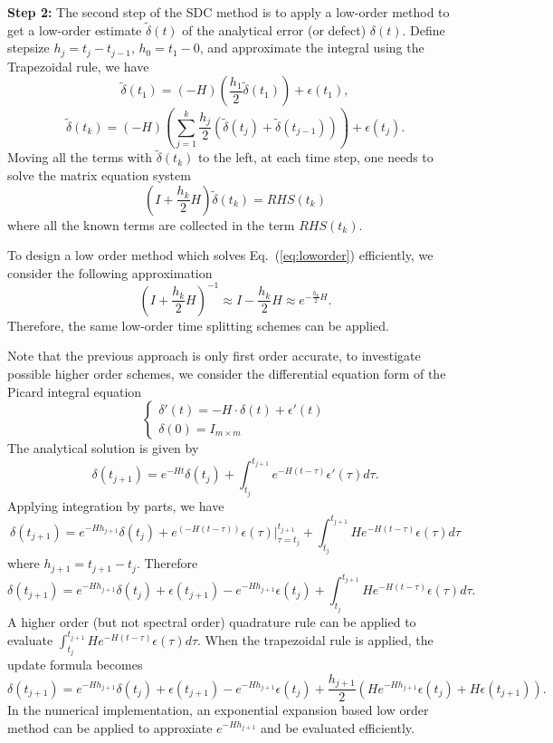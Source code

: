 \documentclass[12pt]{article}
\begin{document}
{\noindent \bf Step 2:} The second step of the SDC method is to apply a low-order method to get a low-order 
estimate $\tilde{\delta}(t)$ of the analytical error (or defect) $\delta(t)$.
Define stepsize $h_j=t_j-t_{j-1}$, $h_0=t_1-0$, and approximate the integral using the Trapezoidal rule, we have
$$\tilde{\delta}(t_1)=(-H) (\frac{h_1}{2} \tilde{\delta}(t_1) )+\epsilon(t_1),$$
$$\tilde{\delta}(t_k)=(-H) \left( \sum_{j=1}^k \frac{h_j}{2} (\tilde{\delta}(t_j)+\tilde{\delta}(t_{j-1})) 
    \right)+\epsilon(t_j).$$
Moving all the terms with $\tilde{\delta}(t_k)$ to the left, at each 
time step, one needs to solve the matrix equation system
\begin{equation}
	\label{eq:loworder}
(I + \frac{h_k}{2} H) \tilde{\delta}(t_k) =RHS(t_k)
\end{equation}
where all the known terms are collected in the term $RHS(t_k)$.

To design a low order method which solves Eq.~(\ref{eq:loworder}) efficiently, we consider the
following approximation
$$(I + \frac{h_k}{2} H)^{-1} \approx I - \frac{h_k}{2} H \approx e^{- \frac{h_k}{2} H}.$$
Therefore, the same low-order time splitting schemes can be applied. 

Note that the previous approach is only first order accurate, to investigate possible higher
order schemes, we consider the differential equation form of the Picard integral equation
\begin{equation}
	\left\{
		\begin{array}{l}
			\delta'(t)= - H \cdot \delta(t) + \epsilon'(t) \\
			\delta(0) = I_{m\times m}
		\end{array}
	\right.
\end{equation}
The analytical solution is given by 
$$\delta(t_{j+1})=e^{-Ht} \delta(t_j) + \int_{t_j}^{t_{j+1}} e^{-H(t- \tau)} \epsilon'(\tau) d \tau.$$
Applying integration by parts, we have 
$$\delta(t_{j+1})=e^{-H h_{j+1}} \delta(t_j) + e^(-H(t-\tau)) \epsilon(\tau) |_{\tau=t_j}^{t_{j+1}} 
  + \int_{t_j}^{t_{j+1}} H e^{-H(t- \tau)} \epsilon(\tau) d \tau$$
where $h_{j+1}=t_{j+1}-t_j$. Therefore
$$\delta(t_{j+1})=e^{-H h_{j+1}} \delta(t_j) + \epsilon(t_{j+1})- e^{-H h_{j+1}} \epsilon(t_j)
  + \int_{t_j}^{t_{j+1}} H e^{-H(t- \tau)} \epsilon(\tau) d \tau.$$
A higher order (but not spectral order) quadrature rule can be applied to 
evaluate $\int_{t_j}^{t_{j+1}} H e^{-H(t- \tau)} \epsilon(\tau) d \tau$.
When the trapezoidal rule is applied, the update formula becomes
$$\delta(t_{j+1})=e^{-H h_{j+1}} \delta(t_j) + \epsilon(t_{j+1})- e^{-H h_{j+1}} \epsilon(t_j)
  + \frac{h_{j+1}}{2} ( H e^{-H h_{j+1}} \epsilon(t_j) +  H \epsilon(t_{j+1})).$$
In the numerical implementation, an exponential expansion based low order method can be applied to
approxiate $e^{-H h_{j+1}}$ and be evaluated efficiently. 
\end{document}

